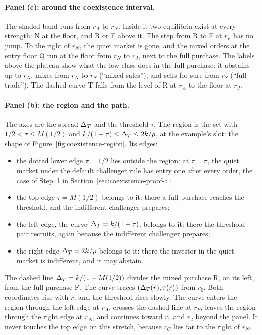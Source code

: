 \paragraph{Panel (c): around the coexistence interval.} The shaded band runs from \(r_A\) to \(r_N\). Inside it two
equilibria exist at every strength: N at the floor, and R or F above it. The step from R to F at \(r_F\) has no jump.
To the right of \(r_N\), the quiet market is gone, and the mixed orders at the entry floor Q run at the floor from
\(r_N\) to \(r_J\), next to the full purchase. The labels above the plateau show what the low class does in the full
purchase: it abstains up to \(r_N\), mixes from \(r_N\) to \(r_S\) (``mixed sales''), and sells for sure from \(r_S\)
(``full trade''). The dashed curve T falls from the level of R at \(r_A\) to the floor at \(r_J\).

\paragraph{Panel (b): the region and the path.} The axes are the spread \(\Delta_T\) and the threshold \(\tau\). The region
is the set with \(1/2<\tau\le M(1/2)\) and \(k/(1-\tau)\le\Delta_T\le2k/\rho\), at the example's slot: the shape of
Figure~\ref{fig:coexistence-region}. Its edges:
\begin{itemize}
\item the dotted lower edge \(\tau=1/2\) lies outside the region: at \(\tau=\pi\), the quiet market under the default
challenger rule has entry one after every order, the case of Step~1 in Section~\ref{sec:coexistence-proof-a};
\item the top edge \(\tau=M(1/2)\) belongs to it: there a full purchase reaches the threshold, and the indifferent
challenger prepares;
\item the left edge, the curve \(\Delta_T=k/(1-\tau)\), belongs to it: there the threshold pair recruits, again because the
indifferent challenger prepares;
\item the right edge \(\Delta_T=2k/\rho\) belongs to it: there the investor in the quiet market is indifferent, and it may
abstain.
\end{itemize}
The dashed line \(\Delta_T=k/(1-M(1/2))\) divides the mixed purchase R, on its left, from the full purchase F. The curve
traces \((\Delta_T(r),\tau(r))\) from \(r_0\). Both coordinates rise with \(r\), and the threshold rises slowly. The curve
enters the region through the left edge at \(r_A\), crosses the dashed line at \(r_F\), leaves the region through the
right edge at \(r_N\), and continues toward \(r_1\) and \(r_2\) beyond the panel. It never touches the top edge on this
stretch, because \(r_C\) lies far to the right of \(r_N\).

